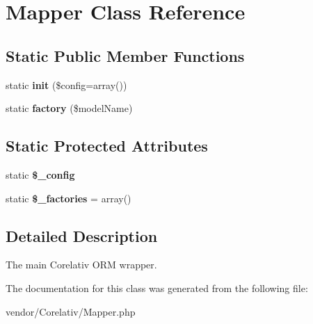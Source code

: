 \hypertarget{classMapper}{
\section{Mapper Class Reference}
\label{classMapper}
}
\subsection*{Static Public Member Functions}
\begin{DoxyCompactItemize}
\item 
\hypertarget{classMapper_a01cec4f90c2926fbc294b81c1d0acc57}{
static {\bfseries init} (\$config=array())}
\label{classMapper_a01cec4f90c2926fbc294b81c1d0acc57}

\item 
\hypertarget{classMapper_a9b40a09ff713ad27a38367c0ae5fc4ce}{
static {\bfseries factory} (\$modelName)}
\label{classMapper_a9b40a09ff713ad27a38367c0ae5fc4ce}

\end{DoxyCompactItemize}
\subsection*{Static Protected Attributes}
\begin{DoxyCompactItemize}
\item 
\hypertarget{classMapper_ab271f548ccc7ce7f28a3bfbf1f3f8e5d}{
static {\bfseries \$\_\-config}}
\label{classMapper_ab271f548ccc7ce7f28a3bfbf1f3f8e5d}

\item 
\hypertarget{classMapper_a6a43e5ce8f2eaa9e05806a9dfc72998e}{
static {\bfseries \$\_\-factories} = array()}
\label{classMapper_a6a43e5ce8f2eaa9e05806a9dfc72998e}

\end{DoxyCompactItemize}


\subsection{Detailed Description}
The main Corelativ ORM wrapper. 

The documentation for this class was generated from the following file:\begin{DoxyCompactItemize}
\item 
vendor/Corelativ/Mapper.php\end{DoxyCompactItemize}
